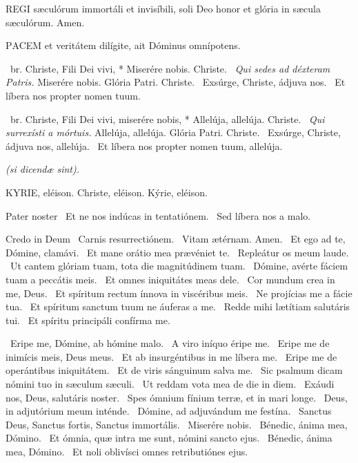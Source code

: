 
\lettrine[lines=2]{R}{EGI} sæculórum immortáli et invisíbili, soli Deo honor et glória in sæcula sæculórum. Amen.



\lettrine[lines=2]{P}{ACEM} et veritátem dilígite, ait Dóminus omnípotens.

\R\ br. Christe, Fili Dei vivi, * Miserére nobis. Christe. \V\ \textit{Qui sedes ad déxteram Patris.} Miserére nobis. Glória Patri. Christe. \V\ Exsúrge, Christe, ádjuva nos. \R\ Et líbera nos propter nomen tuum.



\R\ br. Christe, Fili Dei vivi, miserére nobis, * Allelúja, allelúja. Christe. \V\ \textit{Qui surrexísti a mórtuis.} Allelúja, allelúja. Glória Patri. Christe. \V\ Exsúrge, Christe, ádjuva nos, allelúja. \R\ Et líbera nos propter nomen tuum, allelúja.

\sectionornament


\textit{(si dicendæ sint).}

KYRIE, eléison. Christe, eléison. Kýrie, eléison.

Pater noster  \V\ Et ne nos indúcas in tentatiónem. \R\ Sed líbera nos a malo.

Credo in Deum  \V\ Carnis resurrectiónem. \R\ Vitam ætérnam. Amen. \V\ Et ego ad te, Dómine, clamávi. \R\ Et mane orátio mea prævéniet te. \V\ Repleátur os meum laude. \R\ Ut cantem glóriam tuam, tota die magnitúdinem tuam. \V\ Dómine, avérte fáciem tuam a peccátis meis. \R\ Et omnes iniquitátes meas dele. \V\ Cor mundum crea in me, Deus. \R\ Et spíritum rectum ínnova in viscéribus meis. \V\ Ne projícias me a fácie tua. \R\ Et spíritum sanctum tuum ne áuferas a me. \V\ Redde mihi lætítiam salutáris tui. \R\ Et spíritu principáli confírma me.


\V\ Eripe me, Dómine, ab hómine malo. \R\ A viro iníquo éripe me. \V\ Eripe me de inimícis meis, Deus meus. \R\ Et ab insurgéntibus in me líbera me. \V\ Eripe me de operántibus iniquitátem. \R\ Et de viris sánguinum salva me. \V\ Sic psalmum dicam nómini tuo in sæculum sæculi. \R\ Ut reddam vota mea de die in diem. \V\ Exáudi nos, Deus, salutáris noster. \R\ Spes ómnium fínium terræ, et in mari longe. \V\ Deus, in adjutórium meum inténde. \R\ Dómine, ad adjuvándum me festína. \V\ Sanctus Deus, Sanctus fortis, Sanctus immortális. \R\ Miserére nobis. \V\ Bénedic, ánima mea, Dómino. \R\ Et ómnia, quæ intra me sunt, nómini sancto ejus. \V\ Bénedic, ánima mea, Dómino. \R\ Et noli oblivísci omnes retributiónes ejus.


